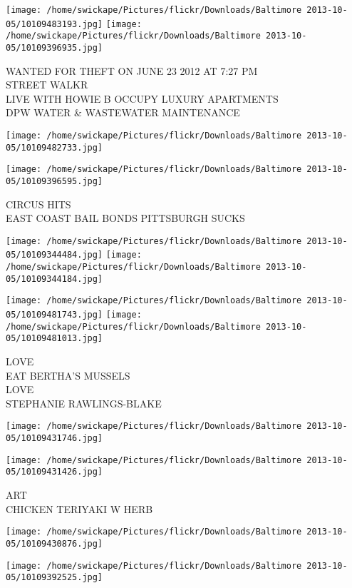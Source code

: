 \documentclass[10pt,letterpaper]{article}
\begin{document}
\texttt{[image: /home/swickape/Pictures/flickr/Downloads/Baltimore 2013-10-05/10109483193.jpg]}
\texttt{[image: /home/swickape/Pictures/flickr/Downloads/Baltimore 2013-10-05/10109396935.jpg]}

WANTED FOR THEFT ON JUNE 23 2012 AT 7:27 PM\\
STREET WALKR\\
LIVE WITH HOWIE B OCCUPY LUXURY APARTMENTS\\
DPW WATER \& WASTEWATER MAINTENANCE
\pagebreak

\texttt{[image: /home/swickape/Pictures/flickr/Downloads/Baltimore 2013-10-05/10109482733.jpg]}

\vspace{0.25in}
\texttt{[image: /home/swickape/Pictures/flickr/Downloads/Baltimore 2013-10-05/10109396595.jpg]}

CIRCUS HITS\\
EAST COAST BAIL BONDS PITTSBURGH SUCKS
\pagebreak

\texttt{[image: /home/swickape/Pictures/flickr/Downloads/Baltimore 2013-10-05/10109344484.jpg]}
\texttt{[image: /home/swickape/Pictures/flickr/Downloads/Baltimore 2013-10-05/10109344184.jpg]}

\texttt{[image: /home/swickape/Pictures/flickr/Downloads/Baltimore 2013-10-05/10109481743.jpg]}
\texttt{[image: /home/swickape/Pictures/flickr/Downloads/Baltimore 2013-10-05/10109481013.jpg]}

LOVE\\
EAT BERTHA'S MUSSELS\\
LOVE\\
STEPHANIE RAWLINGS{-}BLAKE
\pagebreak

\texttt{[image: /home/swickape/Pictures/flickr/Downloads/Baltimore 2013-10-05/10109431746.jpg]}

\vspace{0.25in}
\texttt{[image: /home/swickape/Pictures/flickr/Downloads/Baltimore 2013-10-05/10109431426.jpg]}

ART\\
CHICKEN TERIYAKI W HERB
\pagebreak

\texttt{[image: /home/swickape/Pictures/flickr/Downloads/Baltimore 2013-10-05/10109430876.jpg]}

\vspace{0.25in}
\texttt{[image: /home/swickape/Pictures/flickr/Downloads/Baltimore 2013-10-05/10109392525.jpg]}
\end{document}
